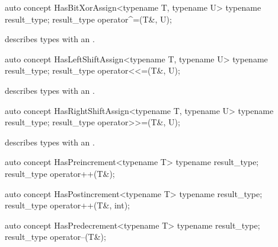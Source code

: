 \documentclass[american,twoside]{book}
\begin{document}
\begin{itemdecl}
auto concept HasBitXorAssign<typename T, typename U> {
  typename result_type;
  result_type operator^=(T&, U);
}
\end{itemdecl}

\begin{itemdescr}
\pnum
\mbox{\reallynote} describes types with an \mbox{}.
\end{itemdescr}

\begin{itemdecl}
auto concept HasLeftShiftAssign<typename T, typename U> {
  typename result_type;
  result_type operator<<=(T&, U);
}
\end{itemdecl}

\begin{itemdescr}
\pnum
\mbox{\reallynote} describes types with an \mbox{}.
\end{itemdescr}

\begin{itemdecl}
auto concept HasRightShiftAssign<typename T, typename U> {
  typename result_type;
  result_type operator>>=(T&, U);
}
\end{itemdecl}

\begin{itemdescr}
\pnum
\mbox{\reallynote} describes types with an \mbox{}.
\end{itemdescr}

\begin{itemdecl}
auto concept HasPreincrement<typename T> {
  typename result_type;
  result_type operator++(T&);
}
\end{itemdecl}

\begin{itemdescr}
\pnum
{}
\end{itemdescr}

\begin{itemdecl}
auto concept HasPostincrement<typename T> {
  typename result_type;
  result_type operator++(T&, int);
}
\end{itemdecl}

\begin{itemdescr}
\pnum
{}
\end{itemdescr}

\begin{itemdecl}
auto concept HasPredecrement<typename T> {
  typename result_type;
  result_type operator--(T&);
}
\end{itemdecl}
\end{document}

